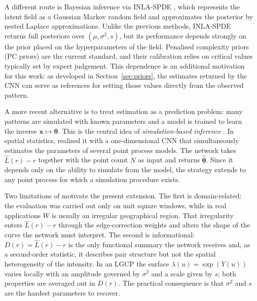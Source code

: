 \documentclass[a4paper,fleqn]{cas-sc}
\numberwithin{equation}{section}
\begin{document}
A different route is Bayesian inference via INLA-SPDE
\citep{Rue2009,toolboxINLA}, which represents the latent field as a
Gaussian Markov random field and approximates the posterior by nested
Laplace approximations. Unlike the previous methods, INLA-SPDE returns
full posteriors over $(\mu,\sigma^2,s)$, but its performance depends
strongly on the prior placed on the hyperparameters of the field.
Penalised complexity priors (PC priors) \citep{simpson2017penalising,
fuglstad2019constructing} are the current standard, and their
calibration relies on critical values typically set by expert
judgement. This dependence is an additional motivation for this work:
as developed in Section~\ref{sec:priors}, the estimates returned by the
CNN can serve as references for setting those values directly from the
observed pattern.

A more recent alternative is to treat estimation as a prediction
problem: many patterns are simulated with known parameters and a model
is trained to learn the inverse $\mathbf{x}\mapsto\boldsymbol{\theta}$.
This is the central idea of \emph{simulation-based inference}
\citep{Cranmer2020}. In spatial statistics, \citet{VIHRS2022} realised
it with a one-dimensional CNN that simultaneously estimates the
parameters of several point process models. The network takes
$\hat{L}(r)-r$ together with the point count $N$ as input and returns
$\hat{\boldsymbol{\theta}}$. Since it depends only on the ability to
simulate from the model, the strategy extends to any point process for
which a simulation procedure exists.

Two limitations of \citet{VIHRS2022} motivate the present extension.
The first is domain-related: the evaluation was carried out only on
unit square windows, while in real applications $W$ is usually an
irregular geographical region. That irregularity enters $\hat{L}(r)-r$
through the edge-correction weights and alters the shape of the curve
the network must interpret. The second is informational:
$D(r)=\hat{L}(r)-r$ is the only functional summary the network receives
and, as a second-order statistic, it describes pair structure but not
the spatial heterogeneity of the intensity. In an LGCP the surface
$\lambda(u)=\exp(Y(u))$ varies locally with an amplitude governed by
$\sigma^2$ and a scale given by $s$; both properties are averaged out
in $D(r)$. The practical consequence is that $\sigma^2$ and $s$ are
the hardest parameters to recover.
\end{document}
